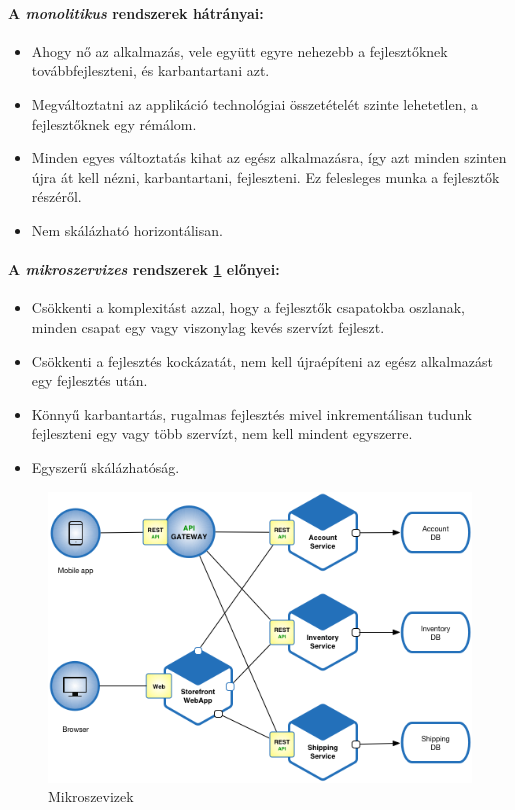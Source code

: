 \paragraph{A \emph{monolitikus} rendszerek hátrányai:}
\begin{itemize}
    \item Ahogy nő az alkalmazás, vele együtt egyre nehezebb a fejlesztőknek továbbfejleszteni, és karbantartani azt.
    \item Megváltoztatni az applikáció technológiai összetételét szinte lehetetlen, a fejlesztőknek egy rémálom.
    \item Minden egyes változtatás kihat az egész alkalmazásra, így azt minden szinten újra át kell nézni, karbantartani, fejleszteni. Ez felesleges munka a fejlesztők részéről.
    \item Nem skálázható horizontálisan.
\end{itemize}

\paragraph{A \emph{mikroszervizes} rendszerek \ref{fig:micro} előnyei: }
\begin{itemize}
    \item Csökkenti a komplexitást azzal, hogy a fejlesztők csapatokba oszlanak, minden csapat egy vagy viszonylag kevés szervízt fejleszt.
    \item Csökkenti a fejlesztés kockázatát, nem kell újraépíteni az egész alkalmazást egy fejlesztés után.
    \item Könnyű karbantartás, rugalmas fejlesztés mivel inkrementálisan tudunk fejleszteni egy vagy több szervízt, nem kell mindent egyszerre.
    \item Egyszerű skálázhatóság.
\end{itemize}

\begin{figure}
    \centering
    \includegraphics[scale=0.6]{images/microservices.png}
    \caption{Mikroszevizek}
    \label{fig:micro}
\end{figure}


